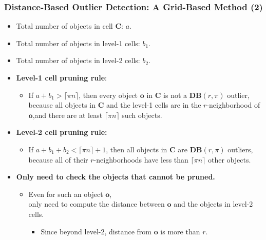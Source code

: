\begin{frame}
  \frametitle{Distance-Based Outlier Detection: A Grid-Based Method (2)}
  \begin{itemize}
  \item Total number of objects in cell $\mathbf{C}$: $a$.
  \item Total number of objects in level-1 cells: $b_1$.
  \item Total number of objects in level-2 cells: $b_2$.
  \end{itemize}
  \begin{itemize}
  \item \textbf{Level-1 cell pruning rule}:
    \begin{itemize}
    \item If $a + b_1 > \lceil \pi n \rceil$, then every object $\mathbf{o}$ in $\mathbf{C}$ is not a $\mathbf{DB}(r, \pi)$ outlier, because all objects in $\mathbf{C}$ and the level-1 cells are in the $r$-neighborhood of $\mathbf{o}$,and there are at least $\lceil \pi n \rceil$ such objects.
    \end{itemize}
  \item \textbf{Level-2 cell pruning rule:}
    \begin{itemize}
    \item If $a + b_1 + b_2 < \lceil \pi n \rceil + 1$, then all objects in $\mathbf{C}$ are $\mathbf{DB}(r, \pi)$ outliers, because all of their $r$-neighborhoods have less than $\lceil \pi n \rceil$ other objects.
    \end{itemize}
  \item \textbf{Only need to check the objects that cannot be pruned.}
    \begin{itemize}
    \item Even for such an object $\mathbf{o}$, \\
      only need to compute the distance between $\mathbf{o}$ and the objects in level-2 cells.
      \begin{itemize}
      \item Since beyond level-2, distance from $\mathbf{o}$ is more than $r$.
      \end{itemize}
    \end{itemize}
  \end{itemize}
\end{frame}



